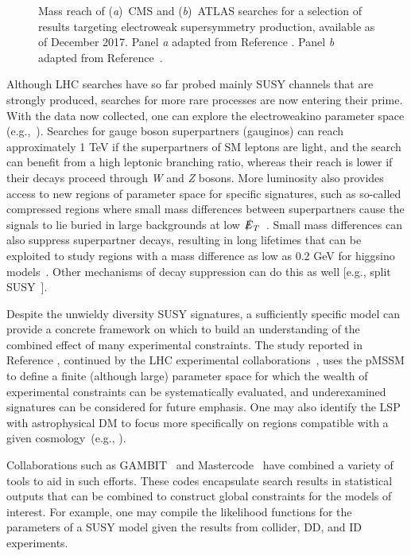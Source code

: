 \documentclass{ar-1col}
\newcommand{\MET}{\ensuremath{\slashed{E}_T}\xspace}
\begin{document}
\begin{figure}[!htpb]
\caption{Mass reach of (\textit{a})\ CMS and (\textit{b})\ ATLAS searches for a selection of
results targeting electroweak supersymmetry production, available as of
December 2017.
Panel \textit{a} adapted from Reference . Panel \textit{b} adapted from Reference~.\label{fig:SUSYSummary_ew}}
\end{figure}

Although LHC searches have so far probed mainly  SUSY channels that are strongly produced, searches for more rare processes are now entering their prime. With the data now collected, one can explore the
electroweakino parameter space (e.g.,~). Searches for gauge
boson superpartners (gauginos) can reach approximately 1 TeV if
the superpartners of SM leptons are light, and the search can
benefit from a high leptonic branching ratio, whereas their reach
is lower if their decays proceed through \textit{W} and \textit{Z} bosons. More
luminosity also provides access to new regions of parameter space
for specific signatures, such as so-called compressed regions where small
mass differences between superpartners cause the signals to lie
buried in large backgrounds at low
\MET~\cite{Aaboud:2017leg,Sirunyan:2017zss}. Small mass
differences can also suppress superpartner decays, resulting in
long lifetimes that can be exploited to study regions with a mass
difference as low as 0.2 GeV for higgsino models~\cite{ATL-PHYS-PUB-2017-019}. Other mechanisms of decay
suppression can do this as well [e.g., split
SUSY~\cite{Sirunyan:2018vjp}].

Despite the unwieldy diversity SUSY signatures, a sufficiently
specific model can provide a concrete framework on which to build
an understanding of the combined effect of many experimental
constraints. The study reported in Reference , continued by the LHC
experimental collaborations~\cite{Aad:2015baa, Khachatryan:2016nvf}, uses the
pMSSM to define a finite (although large) parameter space for
which the wealth of experimental constraints can be systematically
evaluated, and underexamined signatures can be considered for future emphasis.
One may also identify the LSP with astrophysical DM
to focus more specifically on regions compatible with a given
cosmology~(e.g., ).

Collaborations such as GAMBIT~\cite{Athron:2017ard} and
Mastercode~\cite{Bagnaschi:2017tru} have combined a variety of
tools to aid in such efforts. These codes encapsulate search
results in statistical outputs that can be combined to construct
global constraints for the models of interest. For example, one
may compile the likelihood functions for the parameters of a SUSY
model given the results from collider, DD, and ID experiments.
\end{document}

